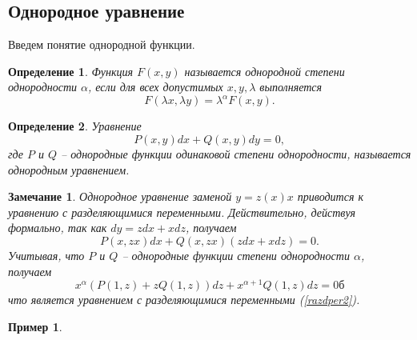 \documentclass[a4paper,14pt]{extarticle}
\newtheorem{definition}{Определение}[subsection]
\newtheorem{example}{Пример}[subsection]
\newtheorem{remark}{Замечание}[subsection]
\newcommand{\be}{\begin{equation}}
\newcommand{\ee}{\end{equation}}
\newcommand{\la}{\label}
\begin{document}
\subsection{Однородное уравнение}
Введем понятие однородной функции.
\begin{definition}
Функция $F(x, y)$ называется однородной степени однородности $\alpha$, если для всех допустимых $x, y, \lambda$ выполняется
$$
F(\lambda x, \lambda y) = \lambda^\alpha F(x, y).
$$	
\end{definition}
\begin{definition}
Уравнение 
\be\la{odnorod}
P(x, y)dx + Q(x, y)dy = 0,
\ee
где $P$ и $Q$ -- однородные функции одинаковой степени однородности, называется однородным уравнением.	
\end{definition}
\begin{remark}
Однородное уравнение заменой $y = z(x)x$ приводится к уравнению с разделяющимися переменными. Действительно, действуя формально, так как $dy = zdx + xdz$, получаем
$$
P(x, zx)dx + Q(x, zx)(zdx + xdz) = 0.
$$	
Учитывая, что $P$ и $Q$ -- однородные функции степени однородности $\alpha$, получаем
$$
x^\alpha(P(1, z) + zQ(1,z))dz + x^{\alpha +1}Q(1, z)dz = 0б
$$
что является уравнением с разделяющимися переменными (\ref{razdper2}).
\end{remark}
\begin{example}
	
\end{example}
\end{document}
